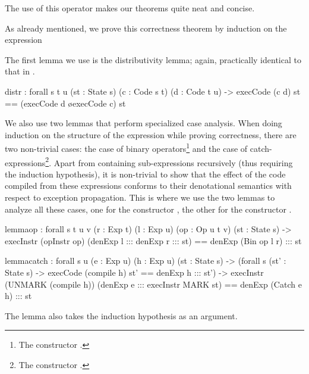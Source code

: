 \noindent The use of this operator makes our theorems quite neat and concise.

As already mentioned, we prove this correctness theorem by induction on the
expression 

The first lemma we use is the distributivity lemma; again, practically
identical to that in .
\begin{code}
  distr : forall {s t u} (st : State s) (c : Code s t) (d : Code t u)
    -> execCode (c \app d) st == (execCode d \o execCode c) st
\end{code}

We also use two lemmas that perform specialized case analysis. When doing
induction on the structure of the expression while proving correctness, there
are two non-trivial cases: the case of binary operators\footnote{The
constructor .} and the case of catch-expressions\footnote{The
constructor .}. Apart from containing sub-expressions recursively
(thus requiring the induction hypothesis), it is non-trivial to show that the
effect of the code compiled from these expressions conforms to their
denotational semantics with respect to exception propagation.  This is where we
use the two lemmas to analyze all these cases, one for the constructor
, the other for the constructor .

\begin{code}
  lemma\-op : forall {s t u v} (r : Exp t) (l : Exp u) (op : Op u t v) (st : State s)
    -> execInstr (opInstr op) (denExp l ::: denExp r ::: st)
      == denExp (Bin op l r) ::: st
\end{code}

\begin{code}
  lemma\-catch : forall {s u} (e : Exp u) (h : Exp u) (st : State s)
    -> (forall {s} (st' : State s) -> execCode (compile h) st' == denExp h ::: st')
    -> execInstr (UNMARK (compile h)) (denExp e ::: execInstr MARK st)
      == denExp (Catch e h) ::: st
\end{code}

The lemma  also takes the induction hypothesis as an argument.





























































